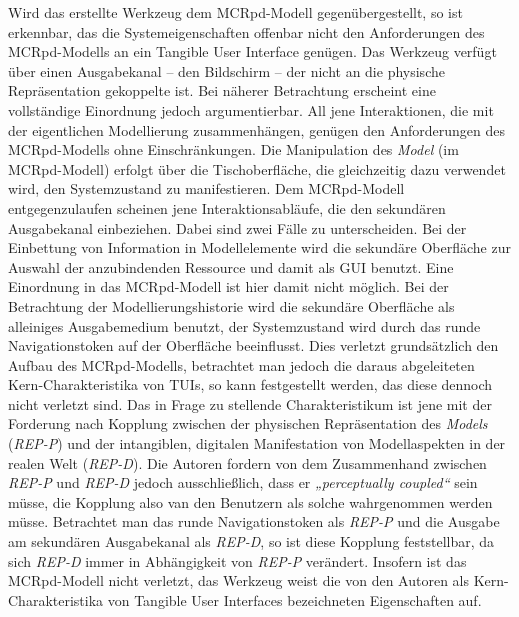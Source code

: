 Wird das erstellte Werkzeug dem \gls{MCRpd}-Modell gegenübergestellt, so ist erkennbar, das die Systemeigenschaften offenbar nicht den Anforderungen des \gls{MCRpd}-Modells an ein Tangible User Interface genügen. Das Werkzeug verfügt über einen Ausgabekanal -- den Bildschirm -- der nicht an die physische Repräsentation gekoppelte ist. Bei näherer Betrachtung erscheint eine vollständige Einordnung jedoch argumentierbar. All jene Interaktionen, die mit der eigentlichen Modellierung zusammenhängen, genügen den Anforderungen des \gls{MCRpd}-Modells ohne Einschränkungen. Die Manipulation des \emph{Model} (im \gls{MCRpd}-Modell) erfolgt über die Tischoberfläche, die gleichzeitig dazu verwendet wird, den Systemzustand zu manifestieren. Dem \gls{MCRpd}-Modell entgegenzulaufen scheinen jene Interaktionsabläufe, die den sekundären Ausgabekanal einbeziehen. Dabei sind zwei Fälle zu unterscheiden. Bei der Einbettung von Information in Modellelemente wird die sekundäre Oberfläche zur Auswahl der anzubindenden Ressource und damit als \gls{GUI} benutzt. Eine Einordnung in das \gls{MCRpd}-Modell ist hier damit nicht möglich. Bei der Betrachtung der Modellierungshistorie wird die sekundäre Oberfläche als alleiniges Ausgabemedium benutzt, der Systemzustand wird durch das runde Navigationstoken auf der Oberfläche beeinflusst. Dies verletzt grundsätzlich den Aufbau des MCRpd-Modells, betrachtet man jedoch die daraus abgeleiteten Kern-Charakteristika von \glspl{TUI}, so kann festgestellt werden, das diese dennoch nicht verletzt sind. Das in Frage zu stellende Charakteristikum ist jene mit der Forderung nach Kopplung zwischen der physischen Repräsentation des \emph{Models} (\emph{REP-P}) und der intangiblen, digitalen Manifestation von Modellaspekten in der realen Welt (\emph{REP-D}). Die Autoren        fordern von dem Zusammenhand zwischen \emph{REP-P} und \emph{REP-D} jedoch ausschließlich, dass er \emph{„perceptually coupled“} sein müsse, die Kopplung also van den Benutzern als solche wahrgenommen werden müsse. Betrachtet man das runde Navigationstoken als \emph{REP-P} und die Ausgabe am sekundären Ausgabekanal als \emph{REP-D}, so ist diese Kopplung feststellbar, da sich \emph{REP-D} immer in Abhängigkeit von \emph{REP-P} verändert. Insofern ist das \gls{MCRpd}-Modell nicht verletzt, das Werkzeug weist die von den Autoren als Kern-Charakteristika von Tangible User Interfaces bezeichneten Eigenschaften auf.

